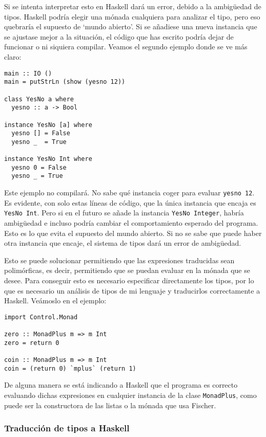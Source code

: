 \documentclass[class=article, crop=false]{standalone}
\begin{document}
Si se intenta interpretar esto en Haskell dará un error, debido a la ambigüedad de tipos.
Haskell podría elegir una mónada cualquiera para analizar el tipo, pero eso quebraría el
supuesto de `mundo abierto'. Si se añadiese una nueva instancia que se ajustase mejor a la
situación, el código que has escrito podría dejar de funcionar o ni siquiera compilar. Veamos
el segundo ejemplo donde se ve más claro\cite{Lipovaca:2011:LYH:2018642}:

\begin{verbatim}
main :: IO ()
main = putStrLn (show (yesno 12))

class YesNo a where
  yesno :: a -> Bool
  
instance YesNo [a] where
  yesno [] = False
  yesno _  = True

instance YesNo Int where
  yesno 0 = False
  yesno _ = True
\end{verbatim}

Este ejemplo no compilará. No sabe qué instancia coger para evaluar \verb`yesno 12`. Es
evidente, con solo estas líneas de código, que la única instancia que encaja es
\verb`YesNo Int`. Pero si en el futuro se añade la instancia \verb`YesNo Integer`, habría
ambigüedad e incluso podría cambiar el comportamiento esperado del programa. Esto es lo que
evita el supuesto del mundo abierto. Si no se sabe que puede haber otra instancia que encaje,
el sistema de tipos dará un error de ambigüedad.

Esto se puede solucionar permitiendo que las expresiones traducidas sean polimórficas, es
decir, permitiendo que se puedan evaluar en la mónada que se desee. Para conseguir esto es
necesario especificar directamente los tipos, por lo que es necesario un análisis de tipos de
mi lenguaje y traducirlos correctamente a Haskell. Veámoslo en el ejemplo:

\begin{verbatim}
import Control.Monad

zero :: MonadPlus m => m Int
zero = return 0

coin :: MonadPlus m => m Int
coin = (return 0) `mplus` (return 1)
\end{verbatim}

De alguna manera se está indicando a Haskell que el programa es correcto evaluando dichas
expresiones en cualquier instancia de la clase \verb`MonadPlus`, como puede ser la
constructora de las listas o la mónada que usa Fischer.

\subsubsection{Traducción de tipos a Haskell}
\end{document}
